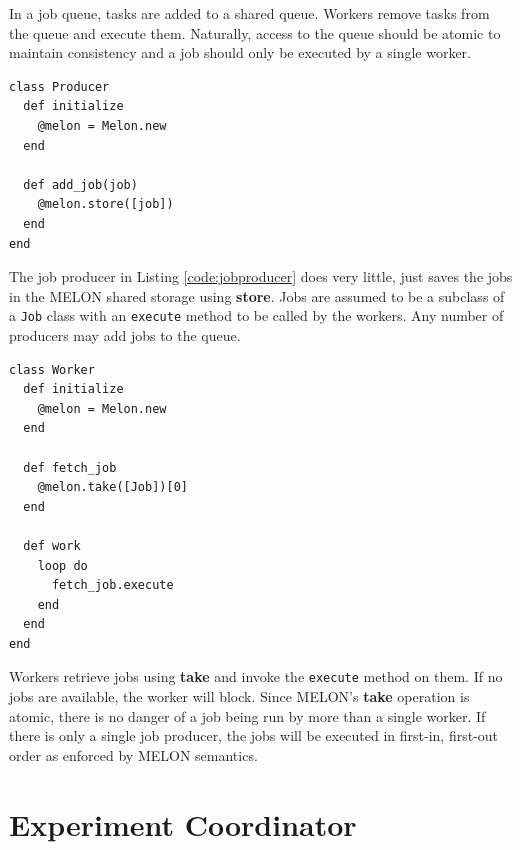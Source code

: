 In a job queue, tasks are added to a shared queue. Workers remove tasks from the queue and execute them. Naturally, access to the queue should be atomic to maintain consistency and a job should only be executed by a single worker.

\begin{lstlisting}[caption={Job Producer}, label={code:jobproducer}]
class Producer
  def initialize
    @melon = Melon.new
  end

  def add_job(job)
    @melon.store([job])
  end
end
\end{lstlisting}

The job producer in Listing \ref{code:jobproducer} does very little, just saves the jobs in the MELON shared storage using \textbf{store}. Jobs are assumed to be a subclass of a \texttt{Job} class with an \texttt{execute} method to be called by the workers. Any number of producers may add jobs to the queue.

\begin{lstlisting}[caption={Worker}, label={code:worker}]
class Worker 
  def initialize
    @melon = Melon.new
  end

  def fetch_job
    @melon.take([Job])[0]
  end

  def work
    loop do
      fetch_job.execute
    end
  end
end
\end{lstlisting}

Workers retrieve jobs using \textbf{take} and invoke the \texttt{execute} method on them. If no jobs are available, the worker will block. Since MELON's \textbf{take} operation is atomic, there is no danger of a job being run by more than a single worker. If there is only a single job producer, the jobs will be executed in first-in, first-out order as enforced by MELON semantics.

\section{Experiment Coordinator}\label{casestudy:coordinator}

